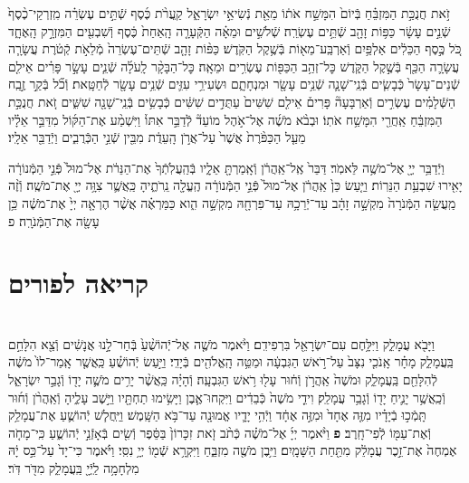 \documentclass[twoside, openany, parskip=half, 11pt]{book}
\begin{document}
\begin{footnotesize}
\begin{multicols}{2}
זֹ֣את חֲנֻכַּ֣ת הַמִּזְבֵּ֗חַ בְּֿיוֹם֙ הִמָּשַׁ֣ח אֹת֔וֹ מֵאֵ֖ת נְֿשִׂיאֵ֣י יִשְׂרָאֵ֑ל קַֽעֲרֹ֨ת כֶּ֜סֶף שְֿׁתֵּ֣ים עֶשְׂרֵ֗ה מִֽזְרְקֵי־כֶ֨סֶף֙ שְֿׁנֵ֣ים עָשָׂ֔ר כַּפּ֥וֹת זָהָ֖ב שְֿׁתֵּ֥ים עֶשְׂרֵֽה׃ שְֿׁלֹשִׁ֣ים וּמֵאָ֗ה הַקְּֿעָרָ֤ה הָֽאַחַת֙ כֶּ֔סֶף וְֿשִׁבְעִ֖ים הַמִּזְרָ֣ק הָֽאֶחָ֑ד כֹּ֚ל כֶּ֣סֶף הַכֵּלִ֔ים אַלְפַּ֥יִם וְֿאַרְבַּֽע־מֵא֖וֹת בְּֿשֶׁ֥קֶל הַקֹּֽדֶשׁ׃ כַּפּ֨וֹת זָהָ֤ב שְֿׁתֵּים־עֶשְׂרֵה֙ מְֿלֵאֹ֣ת קְֿטֹ֔רֶת עֲשָׂרָ֧ה עֲשָׂרָ֛ה הַכַּ֖ף בְּֿשֶׁ֣קֶל הַקֹּ֑דֶשׁ כׇּל־זְהַ֥ב הַכַּפּ֖וֹת עֶשְׂרִ֥ים וּמֵאָֽה׃ כׇּל־הַבָּקָ֨ר לָֽעֹלָ֜ה שְֿׁנֵ֧ים עָשָׂ֣ר פָּרִ֗ים אֵילִ֤ם שְֿׁנֵים־עָשָׂר֙ כְּֿבָשִׂ֧ים בְּֿנֵֽי־שָׁנָ֛ה שְֿׁנֵ֥ים עָשָׂ֖ר וּמִנְחָתָ֑ם וּשְׂעִירֵ֥י עִזִּ֛ים שְֿׁנֵ֥ים עָשָׂ֖ר לְֿחַטָּֽאת׃ וְֿכֹ֞ל בְּֿקַ֣ר זֶ֣בַֽח הַשְּֿׁלָמִ֗ים עֶשְׂרִ֣ים וְֿאַרְבָּעָה֘ פָּרִים֒ אֵילִ֤ם שִׁשִּׁים֙ עַתֻּדִ֣ים שִׁשִּׁ֔ים כְּֿבָשִׂ֥ים בְּֿנֵֽי־שָׁנָ֖ה שִׁשִּׁ֑ים זֹ֚את חֲנֻכַּ֣ת הַמִּזְבֵּ֔חַ אַֽחֲרֵ֖י הִמָּשַׁ֥ח אֹתֽוֹ׃ וּבְבֹ֨א מֹשֶׁ֜ה אֶל־אֹ֣הֶל מוֹעֵד֘ לְֿדַבֵּ֣ר אִתּוֹ֒ וַיִּשְׁמַ֨ע אֶת־הַקּ֜וֹל מִדַּבֵּ֣ר אֵלָ֗יו מֵעַ֤ל הַכַּפֹּ֨רֶת֙ אֲשֶׁר֙ עַל־אֲרֹ֣ן הָֽעֵדֻ֔ת מִבֵּ֖ין שְֿׁנֵ֣י הַכְּֿרֻבִ֑ים וַיְֿדַבֵּ֖ר אֵלָֽיו׃

וַיְֿדַבֵּ֥ר יְיָ֖ אֶל־מֹשֶׁ֥ה לֵּאמֹֽר׃ דַּבֵּר֙ אֶֽל־אַֽהֲרֹ֔ן וְֿאָֽמַרְתָּ֖ אֵלָ֑יו בְּֿהַֽעֲלֹֽתְֿךָ֙ אֶת־הַנֵּרֹ֔ת אֶל־מוּל֙ פְּֿנֵ֣י הַמְּֿנוֹרָ֔ה יָאִ֖ירוּ שִׁבְעַ֥ת הַנֵּרֽוֹת׃ וַיַּ֤עַשׂ כֵּן֙ אַֽהֲרֹ֔ן אֶל־מוּל֙ פְּֿנֵ֣י הַמְּֿנוֹרָ֔ה הֶֽעֱלָ֖ה נֵֽרֹתֶ֑יהָ כַּֽאֲשֶׁ֛ר צִוָּ֥ה יְיָ֖ אֶת־מֹשֶֽׁה׃ וְֿזֶ֨ה מַֽעֲשֵׂ֤ה הַמְּֿנֹרָה֙ מִקְשָׁ֣ה זָהָ֔ב עַד־יְֿרֵכָ֥הּ עַד־פִּרְחָ֖הּ מִקְשָׁ֣ה הִ֑וא כַּמַּרְאֶ֗ה אֲשֶׁ֨ר הֶרְאָ֤ה יְיָ֙ אֶת־מֹשֶׁ֔ה כֵּ֥ן עָשָׂ֖ה אֶת־הַמְּֿנֹרָֽה׃ פ

\end{multicols}

\section[פורים]{קריאה לפורים}


\begin{multicols}{2}
\\
וַיָּבֹ֖א עֲמָלֵ֑ק וַיִּלָּ֥חֶם עִם־יִשְׂרָאֵ֖ל בִּרְפִידִֽם׃ וַיֹּ֨אמֶר מֹשֶׁ֤ה אֶל־יְֿהוֹשֻׁ֨עַ֙ בְּֿחַר־לָ֣נוּ אֲנָשִׁ֔ים וְֿצֵ֖א הִלָּחֵ֣ם בַּֽעֲמָלֵ֑ק מָחָ֗ר אָֽנֹכִ֤י נִצָּב֙ עַל־רֹ֣אשׁ הַגִּבְעָ֔ה וּמַטֵּ֥ה הָֽאֱלֹהִ֖ים בְּֿיָדִֽי׃ וַיַּ֣עַשׂ יְֿהוֹשֻׁ֗עַ כַּֽאֲשֶׁ֤ר אָֽמַר־לוֹ֙ מֹשֶׁ֔ה לְֿהִלָּחֵ֖ם בַּֽעֲמָלֵ֑ק וּמֹשֶׁה֙ אַֽהֲרֹ֣ן וְֿח֔וּר עָל֖וּ רֹ֥אשׁ הַגִּבְעָֽה׃ 
וְֿהָיָ֗ה כַּֽאֲשֶׁ֨ר יָרִ֥ים מֹשֶׁ֛ה יָד֖וֹ וְֿגָבַ֣ר יִשְׂרָאֵ֑ל וְֿכַֽאֲשֶׁ֥ר יָנִ֛יחַ יָד֖וֹ וְֿגָבַ֥ר עֲמָלֵֽק׃ וִידֵ֤י מֹשֶׁה֙ כְּֿבֵדִ֔ים וַיִּקְחוּ־אֶ֛בֶן וַיָּשִׂ֥ימוּ תַחְתָּ֖יו וַיֵּ֣שֶׁב עָלֶ֑יהָ וְֿאַֽהֲרֹ֨ן וְֿח֜וּר תָּֽמְֿכ֣וּ בְֿיָדָ֗יו מִזֶּ֤ה אֶחָד֙ וּמִזֶּ֣ה אֶחָ֔ד וַיְֿהִ֥י יָדָ֛יו אֱמוּנָ֖ה עַד־בֹּ֥א הַשָּֽׁמֶשׁ׃ וַיַּֽחֲל֧שׁ יְֿהוֹשֻׁ֛עַ אֶת־עֲמָלֵ֥ק וְֿאֶת־עַמּ֖וֹ לְֿפִי־חָֽרֶב׃ \textbf{פ}
וַיֹּ֨אמֶר יְיָ֜ אֶל־מֹשֶׁ֗ה כְּֿתֹ֨ב זֹ֤את זִכָּרוֹן֙ בַּסֵּ֔פֶר וְֿשִׂ֖ים בְּֿאָזְֿנֵ֣י יְֿהוֹשֻׁ֑עַ כִּֽי־מָחֹ֤ה אֶמְחֶה֙ אֶת־זֵ֣כֶר עֲמָלֵ֔ק מִתַּ֖חַת הַשָּׁמָֽיִם׃ וַיִּ֥בֶן מֹשֶׁ֖ה מִזְבֵּ֑חַ וַיִּקְרָ֥א שְֿׁמ֖וֹ יְיָ֥ נִסִּֽי׃ וַיֹּ֗אמֶר כִּי־יָד֙ עַל־כֵּ֣ס יָ֔הּ מִלְחָמָ֥ה לַֽיְֿיָ֖ בַּֽעֲמָלֵ֑ק מִדֹּ֖ר דֹּֽר׃


\end{multicols}
\end{footnotesize}
\end{document}
